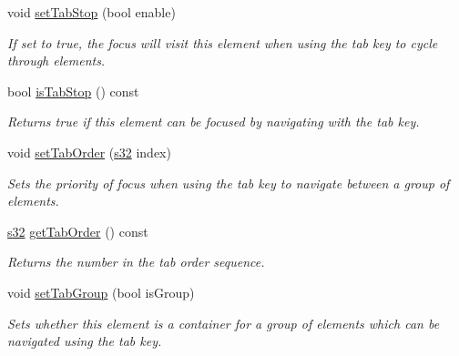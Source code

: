 \begin{DoxyCompactItemize}
void \hyperlink{classirr_1_1gui_1_1IGUIElement_a58b9b6a8715b4959dda905dbc028ece6}{set\+Tab\+Stop} (bool enable)
\begin{DoxyCompactList}\small\item\em If set to true, the focus will visit this element when using the tab key to cycle through elements. \end{DoxyCompactList}\item 
\mbox{\label{classirr_1_1gui_1_1IGUIElement_a0f9c536acf8a57faa18d61ff5b0bf567}} 
bool \hyperlink{classirr_1_1gui_1_1IGUIElement_a0f9c536acf8a57faa18d61ff5b0bf567}{is\+Tab\+Stop} () const
\begin{DoxyCompactList}\small\item\em Returns true if this element can be focused by navigating with the tab key. \end{DoxyCompactList}\item 
void \hyperlink{classirr_1_1gui_1_1IGUIElement_a1aabac2cce7847e5ab17f6c88d129ef7}{set\+Tab\+Order} (\hyperlink{namespaceirr_ac66849b7a6ed16e30ebede579f9b47c6}{s32} index)
\begin{DoxyCompactList}\small\item\em Sets the priority of focus when using the tab key to navigate between a group of elements. \end{DoxyCompactList}\item 
\mbox{\label{classirr_1_1gui_1_1IGUIElement_af1f535aacf6e19fda64511715100e069}} 
\hyperlink{namespaceirr_ac66849b7a6ed16e30ebede579f9b47c6}{s32} \hyperlink{classirr_1_1gui_1_1IGUIElement_af1f535aacf6e19fda64511715100e069}{get\+Tab\+Order} () const
\begin{DoxyCompactList}\small\item\em Returns the number in the tab order sequence. \end{DoxyCompactList}\item 
void \hyperlink{classirr_1_1gui_1_1IGUIElement_aa44a46f3b639ca1b095f855c9d9c959d}{set\+Tab\+Group} (bool is\+Group)
\begin{DoxyCompactList}\small\item\em Sets whether this element is a container for a group of elements which can be navigated using the tab key. \end{DoxyCompactList}\item 
\mbox{\label{classirr_1_1gui_1_1IGUIElement_a70596321725a708ecea4974d4df760c9}} 

\end{DoxyCompactItemize}
